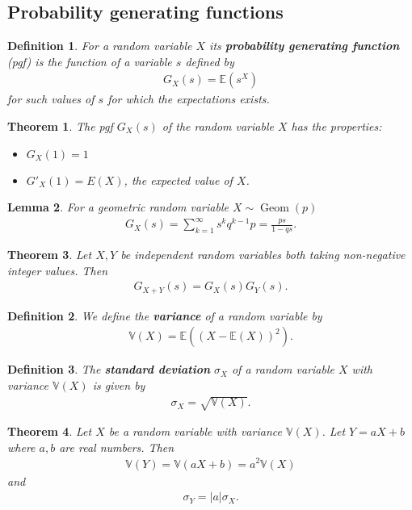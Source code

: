 \documentclass{article}
\theoremstyle{sltheorem}
\newtheorem{definition}{Definition}[section]
\newtheorem{theorem}{Theorem}[section]
\newtheorem{lemma}[theorem]{Lemma}
\newcommand{\E}{\mathbb{E}}
\newcommand{\V}{\mathbb{V}}
\DeclareMathOperator{\Geom}{Geom}
\newcommand*\B[1]{\textbf{#1}}
\begin{document}
\subsection{Probability generating functions}
\begin{definition}
    For a random variable $X$ its \B{probability generating function} (pgf) is the function of a variable
    $s$ defined by
    \begin{align*}
        G_X(s) = \E\left(s^X\right)
    \end{align*}
    for such values of $s$ for which the expectations exists.
\end{definition}
\begin{theorem}
    The pgf $G_X(s)$ of the random variable $X$ has the properties:
    \begin{itemize}
        \item $G_X(1) = 1$
        \item $G'_X(1)=E(X)$, the expected value of $X$.
    \end{itemize}
\end{theorem}
\begin{lemma}
    For a geometric random variable $X\sim \Geom(p)$
    \begin{align*}
        G_X(s) = \sum_{k=1}^\infty s^k q^{k-1}p
        = \frac{ps}{1-qs}.
    \end{align*}
\end{lemma}
\begin{theorem}
    Let $X,Y$ be independent random variables both taking
    non-negative integer values. Then
    \begin{align*}
        G_{X+Y}(s) = G_X(s)G_Y(s).
    \end{align*}
\end{theorem}
\begin{definition}
    We define the \B{variance} of a random variable by
    \begin{align*}
        \V(X) = \E((X-\E(X))^2).
    \end{align*}
\end{definition}
\begin{definition}
    The \B{standard deviation} $\sigma_X$ of a random
    variable $X$ with variance $\V(X)$ is given by
    \begin{align*}
        \sigma_X = \sqrt{\V(X)}.
    \end{align*}
\end{definition}
\begin{theorem}
    Let $X$ be a random variable with variance $\V(X)$.
    Let $Y= a X + b$ where $a,b$ are real numbers.
    Then
    \begin{align*}
        \V(Y) = \V(aX+b) = a^2\V(X)
    \end{align*}
    and
    \begin{align*}
        \sigma_Y = |a|\sigma_X.
    \end{align*}
\end{theorem}
\end{document}
